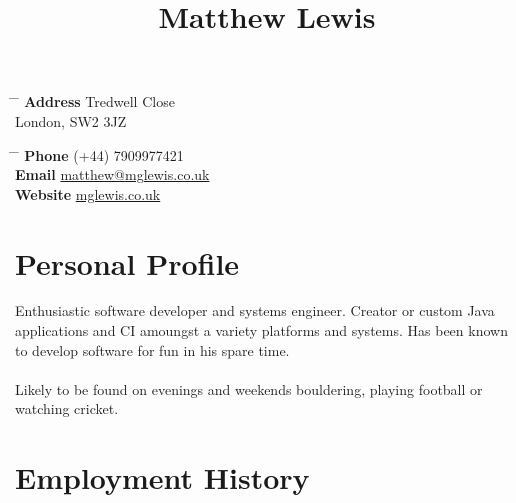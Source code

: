 \documentclass[10pt]{article} %
\begin{document}

\title{Matthew Lewis}


\parbox{0.5\textwidth}{
\begin{tabbing}
\hspace{3cm} \= \hspace{4cm} \= \kill
{\bf Address}  Tredwell Close \\
\> London, SW2 3JZ \\
\end{tabbing}}
\hfill
\parbox{0.5\textwidth}{ 
\begin{tabbing}
\hspace{3cm} \= \hspace{4cm} \= \kill 
{\bf Phone} \> (+44) 7909977421 \\ 
{\bf Email} \> \href{mailto:matthew@mglewis.co.uk}{matthew@mglewis.co.uk} \\ %
{\bf Website} \> \href{http://www.mglewis.co.uk}{mglewis.co.uk}
\end{tabbing}}



\section{Personal Profile}

Enthusiastic software developer and systems engineer. Creator or custom Java applications and 
CI amoungst a variety platforms and systems. Has been known to develop software for fun in his spare time. \\
\\
Likely to be found on evenings and weekends bouldering, playing football or watching cricket. 


\section{Employment History}
\end{document}
